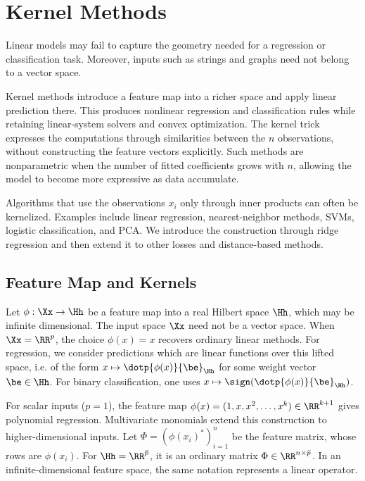 \section{Kernel Methods}
\label{sec-kernel-methods}

Linear models may fail to capture the geometry needed for a regression or classification task. Moreover, inputs such as strings and graphs need not belong to a vector space.

Kernel methods introduce a feature map into a richer space and apply linear prediction there. This produces nonlinear regression and classification rules while retaining linear-system solvers and convex optimization. The kernel trick expresses the computations through similarities between the $n$ observations, without constructing the feature vectors explicitly. Such methods are nonparametric when the number of fitted coefficients grows with $n$, allowing the model to become more expressive as data accumulate.

Algorithms that use the observations $x_i$ only through inner products can often be kernelized. Examples include linear regression, nearest-neighbor methods, SVMs, logistic classification, and PCA. We introduce the construction through ridge regression and then extend it to other losses and distance-based methods.

\subsection{Feature Map and Kernels}

Let $\phi : \Xx \rightarrow \Hh$ be a feature map into a real Hilbert space $\Hh$, which may be infinite dimensional.
%
The input space $\Xx$ need not be a vector space. When $\Xx=\RR^p$, the choice $\phi(x)=x$ recovers ordinary linear methods.
%
For regression, we consider predictions which are linear functions over this lifted space, i.e. of the form $x \mapsto \dotp{\phi(x)}{\be}_\Hh$ for some weight vector $\be \in \Hh$. For binary classification, one uses $x \mapsto \sign(\dotp{\phi(x)}{\be}_\Hh)$.

For scalar inputs ($p=1$), the feature map $\phi(x) = (1,x,x^2,\ldots,x^k)\in\RR^{k+1}$ gives polynomial regression. Multivariate monomials extend this construction to higher-dimensional inputs.
%
Let $\Phi = ( \phi(x_i)^* )_{i=1}^n$ be the feature matrix, whose rows are $\phi(x_i)$. For $\Hh=\RR^{\bar p}$, it is an ordinary matrix $\Phi \in \RR^{n \times \bar p}$. In an infinite-dimensional feature space, the same notation represents a linear operator.

